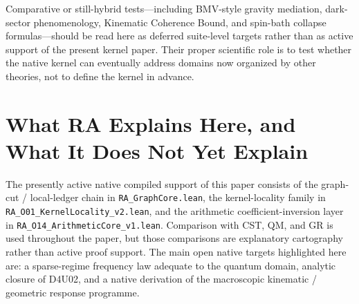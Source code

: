 \documentclass[11pt]{article}
\begin{document}
Comparative or still-hybrid tests---including BMV-style gravity mediation, dark-sector phenomenology, Kinematic Coherence Bound, and spin-bath collapse formulas---should be read here as deferred suite-level targets rather than as active support of the present kernel paper. Their proper scientific role is to test whether the native kernel can eventually address domains now organized by other theories, not to define the kernel in advance.

\section{What RA Explains Here, and What It Does Not Yet Explain}
\label{sec:status}

\begin{tcolorbox}[title=Scope of the active native support layer,colback=gray!5,colframe=gray!60]
The presently active native compiled support of this paper consists of the graph-cut / local-ledger chain in \texttt{RA\_GraphCore.lean}, the kernel-locality family in \texttt{RA\_O01\_KernelLocality\_v2.lean}, and the arithmetic coefficient-inversion layer in \texttt{RA\_O14\_ArithmeticCore\_v1.lean}. Comparison with CST, QM, and GR is used throughout the paper, but those comparisons are explanatory cartography rather than active proof support. The main open native targets highlighted here are: a sparse-regime frequency law adequate to the quantum domain, analytic closure of D4U02, and a native derivation of the macroscopic kinematic / geometric response programme.
\end{tcolorbox}
\end{document}

